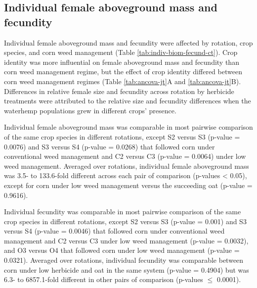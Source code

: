 \documentclass[
]{article}
\author{}
\date{\vspace{-2.5em}}
\begin{document}
\hypertarget{individual-female-aboveground-mass-and-fecundity}{%
\subsection*{Individual female aboveground mass and fecundity}\label{individual-female-aboveground-mass-and-fecundity}}

Individual female aboveground mass and fecundity were affected by rotation, crop species, and corn weed management (Table \ref{tab:indiv-biom-fecund-ct}). Crop identity was more influential on female aboveground mass and fecundity than corn weed management regime, but the effect of crop identity differed between corn weed management regimes (Table \ref{tab:ancova-jt}A and \ref{tab:ancova-jt}B). Differences in relative female size and fecundity across rotation by herbicide treatments were attributed to the relative size and fecundity differences when the waterhemp populations grew in different crops' presence.

Individual female aboveground mass was comparable in most pairwise comparison of the same crop species in different rotations, except S2 versus S3 (p-value = 0.0076) and S3 versus S4 (p-value = 0.0268) that followed corn under conventional weed management and C2 versus C3 (p-value = 0.0064) under low weed management. Averaged over rotations, individual female aboveground mass was 3.5- to 133.6-fold different across each pair of comparison (p-values \textless{} 0.05), except for corn under low weed management versus the succeeding oat (p-value = 0.9616).

Individual fecundity was comparable in most pairwise comparison of the same crop species in different rotations, except S2 versus S3 (p-value = 0.001) and S3 versus S4 (p-value = 0.0046) that followed corn under conventional weed management and C2 versus C3 under low weed management (p-value = 0.0032), and O3 versus O4 that followed corn under low weed management (p-value = 0.0321). Averaged over rotations, individual fecundity was comparable between corn under low herbicide and oat in the same system (p-value = 0.4904) but was 6.3- to 6857.1-fold different in other pairs of comparison (p-values \(\leq\) 0.0001).
\end{document}
